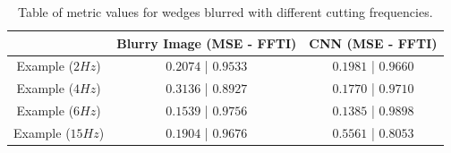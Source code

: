 \documentclass[conference]{IEEEtran}
\begin{document}
\begin{table}[!t]
\renewcommand{\arraystretch}{1.2}
\caption{Table of metric values for wedges blurred with different cutting frequencies.}
\label{table_caso_5}
\centering
\begin{tabular}{|c||c||c|}
\hline
  & Blurry Image (MSE - FFTI) & CNN (MSE - FFTI)\\
\hline
Example ($2Hz$) & $0.2074$ | $0.9533$ & $0.1981$ | $0.9660$\\
\hline
Example ($4Hz$)& $0.3136$ | $0.8927$ & $0.1770$ | $0.9710$\\
\hline
Example ($6Hz$)& $0.1539$ | $0.9756$ & $0.1385$ | $0.9898$\\
\hline
Example ($15Hz$)& $0.1904$ | $0.9676$ & $0.5561$ | $0.8053$\\
\hline
\end{tabular}
\end{table}
\end{document}
